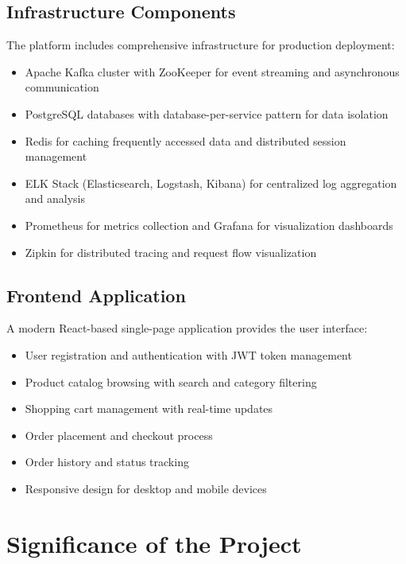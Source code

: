 \subsection{Infrastructure Components}

The platform includes comprehensive infrastructure for production deployment:

\begin{itemize}
    \item Apache Kafka cluster with ZooKeeper for event streaming and asynchronous communication
    \item PostgreSQL databases with database-per-service pattern for data isolation
    \item Redis for caching frequently accessed data and distributed session management
    \item ELK Stack (Elasticsearch, Logstash, Kibana) for centralized log aggregation and analysis
    \item Prometheus for metrics collection and Grafana for visualization dashboards
    \item Zipkin for distributed tracing and request flow visualization
\end{itemize}

\subsection{Frontend Application}

A modern React-based single-page application provides the user interface:

\begin{itemize}
    \item User registration and authentication with JWT token management
    \item Product catalog browsing with search and category filtering
    \item Shopping cart management with real-time updates
    \item Order placement and checkout process
    \item Order history and status tracking
    \item Responsive design for desktop and mobile devices
\end{itemize}

\section{Significance of the Project}

